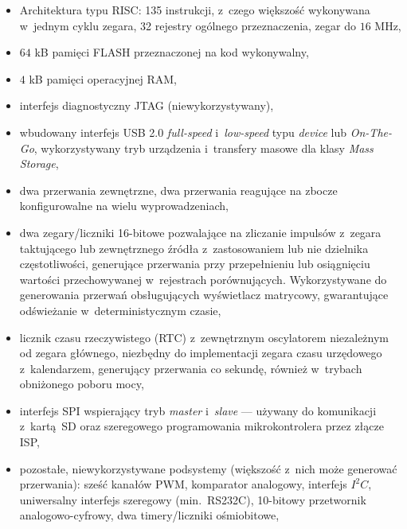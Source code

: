 \begin{itemize}

\item Architektura typu RISC: 135 instrukcji, z~czego większość wykonywana w~jednym cyklu zegara, 32 rejestry ogólnego przeznaczenia, zegar do $16$ MHz,

\item $64$ kB pamięci FLASH przeznaczonej na kod wykonywalny,

\item $4$ kB pamięci operacyjnej RAM,

\item interfejs diagnostyczny JTAG (niewykorzystywany),

\item wbudowany interfejs USB 2.0 \textit{full-speed} i~\textit{low-speed} typu \textit{device} lub \textit{On-The-Go}, wykorzystywany tryb urządzenia i~transfery masowe dla klasy \textit{Mass Storage},

\item dwa przerwania zewnętrzne, dwa przerwania reagujące na zbocze konfigurowalne na wielu wyprowadzeniach,

\item dwa zegary/liczniki 16-bitowe pozwalające na zliczanie impulsów z~zegara taktującego lub zewnętrznego źródła z~zastosowaniem lub nie dzielnika częstotliwości, generujące przerwania przy przepełnieniu lub osiągnięciu wartości przechowywanej w~rejestrach porównujących. Wykorzystywane do generowania przerwań obsługujących wyświetlacz matrycowy, gwarantujące odświeżanie w~deterministycznym czasie,

\item licznik czasu rzeczywistego (RTC) z~zewnętrznym oscylatorem niezależnym od zegara głównego, niezbędny do implementacji zegara czasu urzędowego z~kalendarzem, generujący przerwania co sekundę, również w~trybach obniżonego poboru mocy,

\item interfejs SPI wspierający tryb \textit{master} i~\textit{slave} --- używany do komunikacji z~kartą SD oraz szeregowego programowania mikrokontrolera przez złącze ISP,

\item pozostałe, niewykorzystywane podsystemy (większość z~nich może generować przerwania): sześć kanałów PWM, komparator analogowy, interfejs $I^{2}C$, uniwersalny interfejs szeregowy (min.~RS232C), 10-bitowy przetwornik analogowo-cyfrowy, dwa timery/liczniki ośmiobitowe,


\end{itemize}
